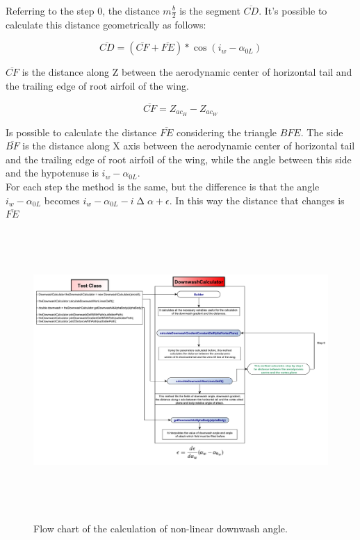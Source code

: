Referring to the step 0, the distance $m  \frac{b}{2}$ is the segment $\overline{CD}$. It's possible to calculate this distance geometrically as follows:

\begin{equation}
\overline{CD} = ( \overline{CF} + \overline{FE} ) * \cos ({i_w -\alpha_{0L}})
\end{equation}

$\overline{CF}$ is the distance along Z between the aerodynamic center of horizontal tail and the trailing edge of root airfoil of the wing.

\begin{equation}
\overline{CF} =Z_{ac_{H}}-Z_{ac_{W}}
\end{equation}

Is possible to calculate the distance $\overline{FE}$ considering the triangle $BFE$. The side  $\overline{BF}$ is the distance along X axis between the aerodynamic center of horizontal tail and the trailing edge of root airfoil of the wing, while the angle between this side and the hypotenuse is $i_w -\alpha_{0L}$.\\

For each step the method is the same, but the difference is that the angle  $i_w -\alpha_{0L}$  becomes $i_w -\alpha_{0L} -i\upDelta\alpha + \epsilon$. In this way the distance that changes is $\overline{FE}$

\begin{figure}[H]
\centering
{\includegraphics[height=10.6cm]{Immagini/nonlinear_2.pdf}} 
\caption{Flow chart of the calculation of non-linear downwash angle.}
\label{flowchartangles}
\end{figure} 


